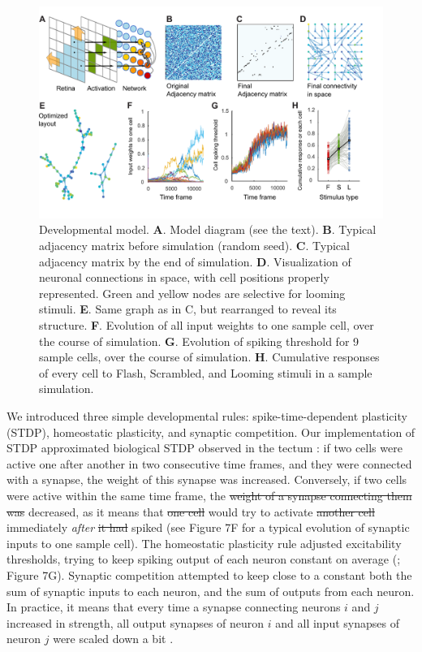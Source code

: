 \documentclass{article}
\providecommand{\DIFaddtex}[1]{{\protect\color{blue}{#1}}} %
\providecommand{\DIFdeltex}[1]{{\protect\color{red}\sout{#1}}}                      %
\providecommand{\DIFaddbegin}{} %
\providecommand{\DIFaddend}{} %
\providecommand{\DIFdelbegin}{} %
\providecommand{\DIFdelend}{} %
\providecommand{\DIFadd}[1]{\texorpdfstring{\DIFaddtex{#1}}{#1}} %
\providecommand{\DIFdel}[1]{\texorpdfstring{\DIFdeltex{#1}}{}} %
\newcommand{\DIFscaledelfig}{0.5}
\newlength{\DIFdelgraphicswidth} %
\newlength{\DIFdelgraphicsheight} %
\newcommand{\DIFaddincludegraphics}[2][]{{\color{blue}\fbox{\DIFOincludegraphics[#1]{#2}}}} %
\newcommand{\DIFdelincludegraphics}[2][]{%
\sbox{\DIFdelgraphicsbox}{\DIFOincludegraphics[#1]{#2}}%
\settoboxwidth{\DIFdelgraphicswidth}{\DIFdelgraphicsbox} %
\settoboxtotalheight{\DIFdelgraphicsheight}{\DIFdelgraphicsbox} %
\scalebox{\DIFscaledelfig}{%
\parbox[b]{\DIFdelgraphicswidth}{\usebox{\DIFdelgraphicsbox}\\[-\baselineskip] \rule{\DIFdelgraphicswidth}{0em}}\llap{\resizebox{\DIFdelgraphicswidth}{\DIFdelgraphicsheight}{%
\setlength{\unitlength}{\DIFdelgraphicswidth}%
\begin{picture}(1,1)%
\thicklines\linethickness{2pt} %
{\color[rgb]{1,0,0}\put(0,0){\framebox(1,1){}}}%
{\color[rgb]{1,0,0}\put(0,0){\line( 1,1){1}}}%
{\color[rgb]{1,0,0}\put(0,1){\line(1,-1){1}}}%
\end{picture}%
}\hspace*{3pt}}} %
} %
\DeclareRobustCommand{\DIFaddbegin}{\DIFOaddbegin \let\includegraphics\DIFaddincludegraphics} %
\DeclareRobustCommand{\DIFaddend}{\DIFOaddend \let\includegraphics\DIFOincludegraphics} %
\DeclareRobustCommand{\DIFdelbegin}{\DIFOdelbegin \let\includegraphics\DIFdelincludegraphics} %
\DeclareRobustCommand{\DIFdelend}{\DIFOaddend \let\includegraphics\DIFOincludegraphics} %
\begin{document}
\begin{figure}[!t]
\includegraphics[width=\linewidth]{fig7.pdf}
\caption{
Developmental model. \textbf{A}. Model diagram (see the text). \textbf{B}. Typical adjacency matrix before simulation (random seed). \textbf{C}. Typical adjacency matrix by the end of simulation. \textbf{D}. Visualization of neuronal connections in space, with cell positions properly represented. Green and yellow nodes are selective for looming stimuli. \textbf{E}. Same graph as in C, but rearranged to reveal its structure. \textbf{F}. Evolution of all input weights to one sample cell, over the course of simulation. \textbf{G}. Evolution of spiking threshold for 9 sample cells, over the course of simulation. \textbf{H}. Cumulative responses of every cell to Flash, Scrambled, and Looming stimuli in a sample simulation. }
\end{figure}

We introduced three simple developmental rules: spike-time-dependent plasticity (STDP), homeostatic plasticity, and synaptic competition. Our implementation of STDP approximated biological STDP observed in the tectum \citep{zhang1998stdp, mu2006stdp}: if two cells were active one after another in two consecutive time frames, and they were connected with a synapse, the weight of this synapse was increased. Conversely, if two cells were active within the same time frame, the \DIFdelbegin \DIFdel{weight of a synapse connecting them was }\DIFdelend \DIFaddbegin \DIFadd{weights of a synapses connecting them were }\DIFaddend decreased, as it means that \DIFdelbegin \DIFdel{one cell }\DIFdelend \DIFaddbegin \DIFadd{cells }\DIFaddend would try to activate \DIFdelbegin \DIFdel{another cell }\DIFdelend \DIFaddbegin \DIFadd{each other }\DIFaddend immediately \textit{after} \DIFdelbegin \DIFdel{it had }\DIFdelend \DIFaddbegin \DIFadd{they }\DIFaddend spiked (see Figure 7F for a typical evolution of synaptic inputs to one sample cell). The homeostatic plasticity rule adjusted excitability thresholds, trying to keep spiking output of each neuron constant on average (\citealt{pratt2007intrinsic, turrigiano2011}; Figure 7G). Synaptic competition attempted to keep close to a constant both the sum of synaptic inputs to each neuron, and the sum of outputs from each neuron. In practice, it means that every time a synapse connecting neurons $i$ and $j$ increased in strength, all output synapses of neuron $i$ and all input synapses of neuron $j$ were scaled down a bit \citep{cohen2002synreview, munz2014hebbian, hamodi2016nmda}.
\end{document}
